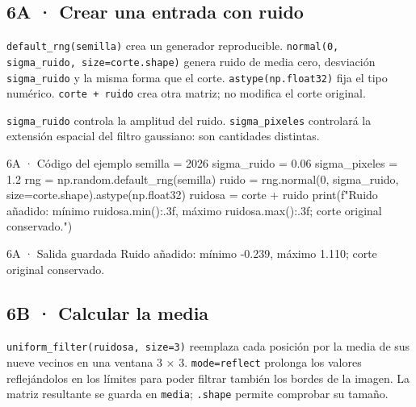 \subsection*{6A · Crear una entrada con ruido}

\label{vivo:6a}

\texttt{\small default\_rng(\allowbreak{}semilla)\allowbreak{}} crea un generador reproducible. \texttt{\small normal(\allowbreak{}0,\allowbreak{} sigma\_ruido,\allowbreak{} size=corte.\allowbreak{}shape)\allowbreak{}} genera ruido de media cero, desviación \texttt{\small sigma\_ruido} y la misma forma que el corte. \texttt{\small astype(\allowbreak{}np.\allowbreak{}float32)\allowbreak{}} fija el tipo numérico. \texttt{\small corte + ruido} crea otra matriz; no modifica el corte original.

\texttt{\small sigma\_ruido} controla la amplitud del ruido. \texttt{\small sigma\_pixeles} controlará la extensión espacial del filtro gaussiano: son cantidades distintas.

\begin{CodigoVivo}{6A · Código del ejemplo}
semilla = 2026
sigma_ruido = 0.06
sigma_pixeles = 1.2
rng = np.random.default_rng(semilla)
ruido = rng.normal(0, sigma_ruido, size=corte.shape).astype(np.float32)
ruidosa = corte + ruido
print(f"Ruido añadido: mínimo {ruidosa.min():.3f}, máximo {ruidosa.max():.3f}; corte original conservado.")
\end{CodigoVivo}


\begin{Salida}{6A · Salida guardada}
Ruido añadido: mínimo -0.239, máximo 1.110; corte original conservado.
\end{Salida}



\subsection*{6B · Calcular la media}

\label{vivo:6b}

\texttt{\small uniform\_filter(\allowbreak{}ruidosa,\allowbreak{} size=3)\allowbreak{}} reemplaza cada posición por la media de sus nueve vecinos en una ventana 3 × 3. \texttt{\small mode=\textquotedbl{}reflect\textquotedbl{}} prolonga los valores reflejándolos en los límites para poder filtrar también los bordes de la imagen. La matriz resultante se guarda en \texttt{\small media}; \texttt{\small .\allowbreak{}shape} permite comprobar su tamaño.

